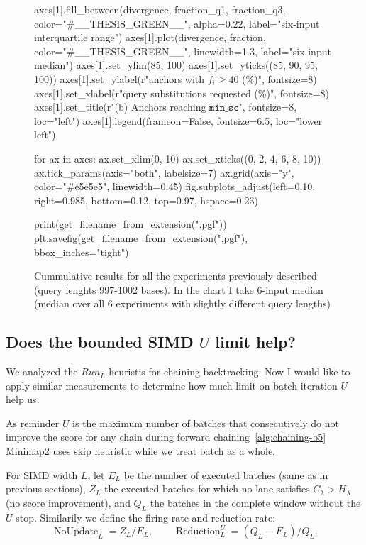 \begin{figure}[H]
\begin{CacheMeCode}
axes[1].fill_between(divergence, fraction_q1, fraction_q3,
                     color="#__THESIS_GREEN__", alpha=0.22,
                     label="six-input interquartile range")
axes[1].plot(divergence, fraction, color="#__THESIS_GREEN__", linewidth=1.3,
             label="six-input median")
axes[1].set_ylim(85, 100)
axes[1].set_yticks((85, 90, 95, 100))
axes[1].set_ylabel(r"anchors with $f_i\geq40$ (\%)", fontsize=8)
axes[1].set_xlabel(r"query substitutions requested (\%)", fontsize=8)
axes[1].set_title(r"(b) Anchors reaching $\mathtt{min\_sc}$", fontsize=8, loc="left")
axes[1].legend(frameon=False, fontsize=6.5, loc="lower left")

for ax in axes:
    ax.set_xlim(0, 10)
    ax.set_xticks((0, 2, 4, 6, 8, 10))
    ax.tick_params(axis="both", labelsize=7)
    ax.grid(axis="y", color="#e5e5e5", linewidth=0.45)
fig.subplots_adjust(left=0.10, right=0.985, bottom=0.12, top=0.97, hspace=0.23)

print(get_filename_from_extension(".pgf"))
plt.savefig(get_filename_from_extension(".pgf"), bbox_inches="tight")
\end{CacheMeCode}
\caption{Cummulative results for all the experiments previously described (query lenghts 997-1002 bases). In the chart I take 6-input median (median over all 6 experiments with slightly different query lengths)}
\label{fig:chaining-max-drop-score-divergence}
\end{figure}

\subsection{Does the bounded SIMD \texorpdfstring{$U$}{U} limit help?}
\label{sec:chaining-u-batch-experiment}
\begingroup
\small
\setlength{\intextsep}{5pt plus 1pt minus 1pt}

We analyzed the $Run_L$ heuristis for chaining backtracking. Now I would like to apply similar measurements to determine how much limit on batch iteration $U$ help us.

As reminder $U$ is the maximum number of batches that consecutively do not improve the score for any chain during forward chaining~\ref{alg:chaining-b5}
Minimap2 uses skip heuristic while we treat batch as a whole.

For SIMD width \(L\), let \(E_L\) be the number of executed batches (same as in previous sections), \(Z_L\) the
executed batches for which no lane satisfies \(C_\lambda>H_\lambda\) (no score improvement), and
\(Q_L\) the batches in the complete window without the \(U\) stop. Similarily we define the firing rate and reduction rate:
\[
 \operatorname{NoUpdate}_L=Z_L/E_L,
 \qquad
 \operatorname{Reduction}^{U}_L=(Q_L-E_L)/Q_L.
\]

